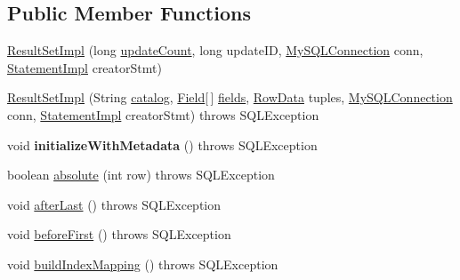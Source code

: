 \subsection*{Public Member Functions}
\begin{DoxyCompactItemize}
\item 
\mbox{\hyperlink{classcom_1_1mysql_1_1jdbc_1_1_result_set_impl_a213c844e09d851346717edbe91683621}{Result\+Set\+Impl}} (long \mbox{\hyperlink{classcom_1_1mysql_1_1jdbc_1_1_result_set_impl_a3278756f102c97b9e4f5e5aa53590722}{update\+Count}}, long update\+ID, \mbox{\hyperlink{interfacecom_1_1mysql_1_1jdbc_1_1_my_s_q_l_connection}{My\+S\+Q\+L\+Connection}} conn, \mbox{\hyperlink{classcom_1_1mysql_1_1jdbc_1_1_statement_impl}{Statement\+Impl}} creator\+Stmt)
\item 
\mbox{\hyperlink{classcom_1_1mysql_1_1jdbc_1_1_result_set_impl_a6e4a9d2710dcc61d476408d2cf4fe52c}{Result\+Set\+Impl}} (String \mbox{\hyperlink{classcom_1_1mysql_1_1jdbc_1_1_result_set_impl_ae05d8a0ad69c96645b783537100fb95c}{catalog}}, \mbox{\hyperlink{classcom_1_1mysql_1_1jdbc_1_1_field}{Field}}\mbox{[}$\,$\mbox{]} \mbox{\hyperlink{classcom_1_1mysql_1_1jdbc_1_1_result_set_impl_a5da5c6ef8d035aa65884115a2f7daf67}{fields}}, \mbox{\hyperlink{interfacecom_1_1mysql_1_1jdbc_1_1_row_data}{Row\+Data}} tuples, \mbox{\hyperlink{interfacecom_1_1mysql_1_1jdbc_1_1_my_s_q_l_connection}{My\+S\+Q\+L\+Connection}} conn, \mbox{\hyperlink{classcom_1_1mysql_1_1jdbc_1_1_statement_impl}{Statement\+Impl}} creator\+Stmt)  throws S\+Q\+L\+Exception 
\item 
\mbox{\label{classcom_1_1mysql_1_1jdbc_1_1_result_set_impl_a6a0bbb03dc5743cfb6e66f583539ab25}} 
void {\bfseries initialize\+With\+Metadata} ()  throws S\+Q\+L\+Exception 
\item 
boolean \mbox{\hyperlink{classcom_1_1mysql_1_1jdbc_1_1_result_set_impl_a780c371204d84b09d2bdcd86a1a67ac3}{absolute}} (int row)  throws S\+Q\+L\+Exception 
\item 
void \mbox{\hyperlink{classcom_1_1mysql_1_1jdbc_1_1_result_set_impl_aee4b698ed324d8836812bd80994aeb5e}{after\+Last}} ()  throws S\+Q\+L\+Exception 
\item 
void \mbox{\hyperlink{classcom_1_1mysql_1_1jdbc_1_1_result_set_impl_af1a54bdb7af316f706caf50a5819f1e9}{before\+First}} ()  throws S\+Q\+L\+Exception 
\item 
void \mbox{\hyperlink{classcom_1_1mysql_1_1jdbc_1_1_result_set_impl_a452c11779f86bee1e87c0b8231a23dd1}{build\+Index\+Mapping}} ()  throws S\+Q\+L\+Exception 

\end{DoxyCompactItemize}
